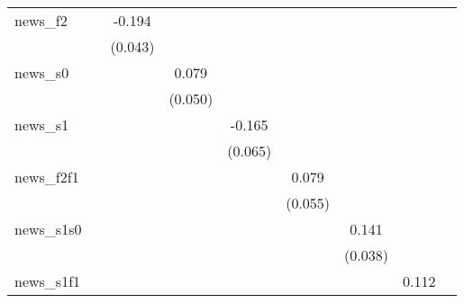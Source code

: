 {\begin{tabular}{l*{8}{c}}
news\_f2     &                     &      -0.194\sym{***}&                     &                     &                     &                     &                     &                     \\
            &                     &     (0.043)         &                     &                     &                     &                     &                     &                     \\
\addlinespace
news\_s0     &                     &                     &       0.079         &                     &                     &                     &                     &                     \\
            &                     &                     &     (0.050)         &                     &                     &                     &                     &                     \\
\addlinespace
news\_s1     &                     &                     &                     &      -0.165\sym{**} &                     &                     &                     &                     \\
            &                     &                     &                     &     (0.065)         &                     &                     &                     &                     \\
\addlinespace
news\_f2f1   &                     &                     &                     &                     &       0.079         &                     &                     &                     \\
            &                     &                     &                     &                     &     (0.055)         &                     &                     &                     \\
\addlinespace
news\_s1s0   &                     &                     &                     &                     &                     &       0.141\sym{***}&                     &                     \\
            &                     &                     &                     &                     &                     &     (0.038)         &                     &                     \\
\addlinespace
news\_s1f1   &                     &                     &                     &                     &                     &                     &       0.112         &                     \\

\end{tabular}}
